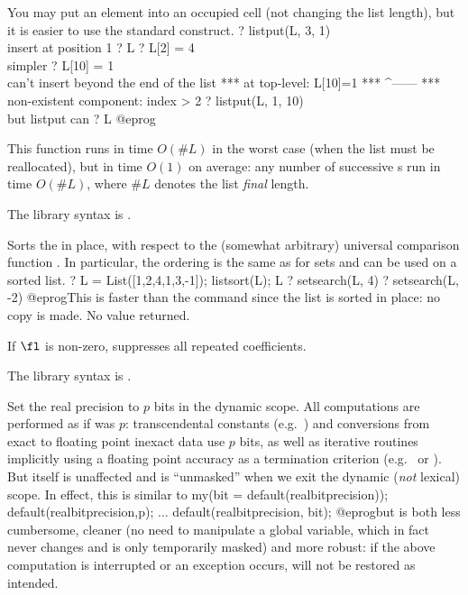 You may put an element into an occupied cell (not changing the
list length), but it is easier to use the standard 
construct.
\bprog
? listput(L, 3, 1) \\ insert at position 1
? L
? L[2] = 4 \\ simpler
? L[10] = 1  \\ can't insert beyond the end of the list
 ***   at top-level: L[10]=1
 ***                  ^------
 ***   non-existent component: index > 2
? listput(L, 1, 10) \\ but listput can
? L
@eprog

This function runs in time $O(\#L)$ in the worst case (when the list must
be reallocated), but in time $O(1)$ on average: any number of successive
s run in time $O(\#L)$, where $\#L$ denotes the list
\emph{final} length.

The library syntax is .

\label{se:listsort}
Sorts the   in place, with respect to the (somewhat
arbitrary) universal comparison function . In particular, the
ordering is the same as for sets and  can be used on a sorted
list.
\bprog
? L = List([1,2,4,1,3,-1]); listsort(L); L
? setsearch(L, 4)
? setsearch(L, -2)
@eprog\noindent This is faster than the  command since the list
is sorted in place: no copy is made. No value returned.

If $\fl$ is non-zero, suppresses all repeated coefficients.

The library syntax is .

\label{se:localbitprec}
Set the real precision to $p$ bits in the dynamic scope. All computations
are performed as if  was $p$:
transcendental constants (e.g.~) and
conversions from exact to floating point inexact data use $p$ bits, as well as
iterative routines implicitly using a floating point
accuracy as a termination criterion (e.g.~ or ).
But  itself is unaffected
and is ``unmasked'' when we exit the dynamic (\emph{not} lexical) scope.
In effect, this is similar to
\bprog
my(bit = default(realbitprecision));
default(realbitprecision,p);
...
default(realbitprecision, bit);
@eprog\noindent but is both less cumbersome, cleaner (no need to manipulate
a global variable, which in fact never changes and is only temporarily masked)
and more robust: if the above computation is interrupted or an exception
occurs,  will not be restored as intended.

